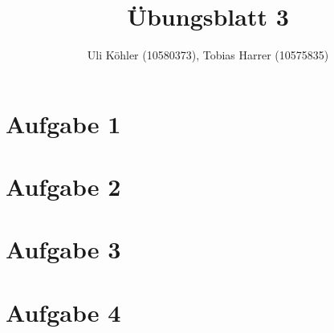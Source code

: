 \documentclass[a4paper,10pt,freqn]{article}
\title{Übungsblatt 3}
\author{Uli Köhler (10580373), Tobias Harrer (10575835)}
\begin{document}
\maketitle

\section{Aufgabe 1}
\section{Aufgabe 2}
\section{Aufgabe 3}
\section{Aufgabe 4}
\end{document}
